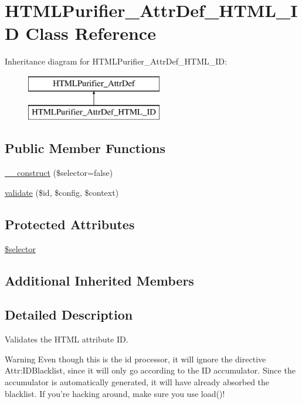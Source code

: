 \hypertarget{classHTMLPurifier__AttrDef__HTML__ID}{\section{H\+T\+M\+L\+Purifier\+\_\+\+Attr\+Def\+\_\+\+H\+T\+M\+L\+\_\+\+I\+D Class Reference}
\label{classHTMLPurifier__AttrDef__HTML__ID}
}
Inheritance diagram for H\+T\+M\+L\+Purifier\+\_\+\+Attr\+Def\+\_\+\+H\+T\+M\+L\+\_\+\+I\+D\+:\begin{figure}[H]
\begin{center}
\leavevmode
\includegraphics[height=2.000000cm]{classHTMLPurifier__AttrDef__HTML__ID}
\end{center}
\end{figure}
\subsection*{Public Member Functions}
\begin{DoxyCompactItemize}
\item 
\hyperlink{classHTMLPurifier__AttrDef__HTML__ID_ac407563e90703ea3fd8ddcf46bfa293c}{\+\_\+\+\_\+construct} (\$selector=false)
\item 
\hyperlink{classHTMLPurifier__AttrDef__HTML__ID_a19e1d09ba0961fd2d64c35eb3c22957a}{validate} (\$id, \$config, \$context)
\end{DoxyCompactItemize}
\subsection*{Protected Attributes}
\begin{DoxyCompactItemize}
\item 
\hyperlink{classHTMLPurifier__AttrDef__HTML__ID_a7a0c9b401031cff44d814aa25591d180}{\$selector}
\end{DoxyCompactItemize}
\subsection*{Additional Inherited Members}


\subsection{Detailed Description}
Validates the H\+T\+M\+L attribute I\+D. \begin{DoxyWarning}{Warning}
Even though this is the id processor, it will ignore the directive Attr\+:I\+D\+Blacklist, since it will only go according to the I\+D accumulator. Since the accumulator is automatically generated, it will have already absorbed the blacklist. If you're hacking around, make sure you use load()! 
\end{DoxyWarning}


